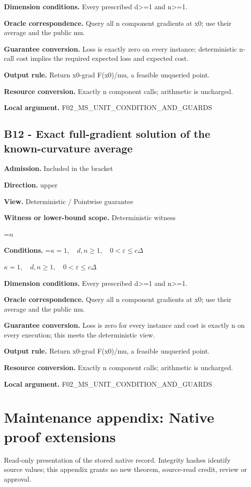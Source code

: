 \documentclass[10pt,a4paper]{article}
\newcommand{\AtlasMath}[1]{\par\begingroup\centering\setbox0=\hbox{$\displaystyle #1$}\ifdim\wd0>1.4\linewidth\typeout{ATLAS WIDE FORMULA: \the\wd0}\fi\ifdim\wd0>\linewidth\resizebox{\linewidth}{!}{\box0}\else\box0\fi\par\endgroup}
\newcommand{\AtlasInlineMath}[1]{\begingroup\setbox0=\hbox{$#1$}\ifdim\wd0>.4\linewidth\endgroup\AtlasMath{#1}\else\endgroup$#1$\fi}
\begin{document}
\textbf{Dimension conditions.} Every prescribed d>=1 and n>=1.

\textbf{Oracle correspondence.} Query all n component gradients at x0; use their average and the public mu.

\textbf{Guarantee conversion.} Loss is exactly zero on every instance; deterministic n-call cost implies the required expected loss and expected cost.

\textbf{Output rule.} Return x0-grad F(x0)/mu, a feasible unqueried point.

\textbf{Resource conversion.} Exactly n component calls; arithmetic is uncharged.

\textbf{Local argument.} F02\_\allowbreak{}MS\_\allowbreak{}UNIT\_\allowbreak{}CONDITION\_\allowbreak{}AND\_\allowbreak{}GUARDS

\subsection{B12 - Exact full-gradient solution of the known-curvature average}
\textbf{Admission.} Included in the bracket

\textbf{Direction.} upper

\textbf{View.} Deterministic / Pointwise guarantee

\textbf{Witness or lower-bound scope.} Deterministic witness

\AtlasMath{n}
\textbf{Conditions.} \AtlasInlineMath{\kappa=1,\quad d,n\ge1,\quad0<\varepsilon\le c\Delta}

\textbf{Dimension conditions.} Every prescribed d>=1 and n>=1.

\textbf{Oracle correspondence.} Query all n component gradients at x0; use their average and the public mu.

\textbf{Guarantee conversion.} Loss is zero for every instance and cost is exactly n on every execution; this meets the deterministic view.

\textbf{Output rule.} Return x0-grad F(x0)/mu, a feasible unqueried point.

\textbf{Resource conversion.} Exactly n component calls; arithmetic is uncharged.

\textbf{Local argument.} F02\_\allowbreak{}MS\_\allowbreak{}UNIT\_\allowbreak{}CONDITION\_\allowbreak{}AND\_\allowbreak{}GUARDS

\section{Maintenance appendix: Native proof extensions}
Read-only presentation of the stored native record. Integrity hashes identify source values; this appendix grants no new theorem, source-read credit, review or approval.
\end{document}
